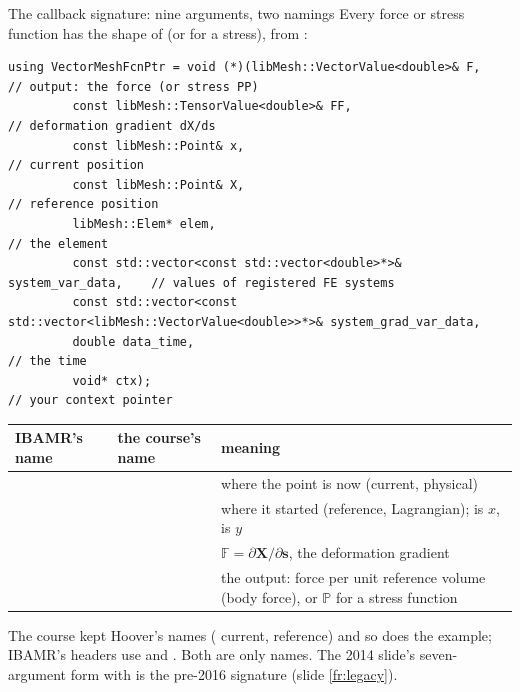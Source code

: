 \documentclass[aspectratio=169,11pt]{beamer}
\begin{document}
\begin{frame}[fragile]{The callback signature: nine arguments, two namings}
\label{fr:signature}
\footnotesize
Every force or stress function has the shape of  (or  for a stress), from :
\begin{lstlisting}[style=cpptiny]
using VectorMeshFcnPtr = void (*)(libMesh::VectorValue<double>& F,          // output: the force (or stress PP)
         const libMesh::TensorValue<double>& FF,                            // deformation gradient dX/ds
         const libMesh::Point& x,                                           // current position
         const libMesh::Point& X,                                           // reference position
         libMesh::Elem* elem,                                               // the element
         const std::vector<const std::vector<double>*>& system_var_data,    // values of registered FE systems
         const std::vector<const std::vector<libMesh::VectorValue<double>>*>& system_grad_var_data,
         double data_time,                                                  // the time
         void* ctx);                                                        // your context pointer
\end{lstlisting}
\begin{tabular}{@{}L{0.22\textwidth}L{0.22\textwidth}L{0.46\textwidth}@{}}
\toprule
IBAMR's name & the course's name & meaning \\
\midrule
{} &  & where the point is now (current, physical) \\
 &  & where it started (reference, Lagrangian);  is $x$,  is $y$ \\
 &  & $\mathbb{F} = \partial\mathbf{X}/\partial\mathbf{s}$, the deformation gradient \\
 &  & the output: force per unit reference volume (body force), or $\mathbb{P}$ for a stress function \\
\bottomrule
\end{tabular}

{\scriptsize The course kept Hoover's names ( current,  reference) and so does the example; IBAMR's headers use  and . Both are only names. The 2014 slide's seven-argument form with  is the pre-2016 signature (slide \ref{fr:legacy}).\par}
\end{frame}
\end{document}
